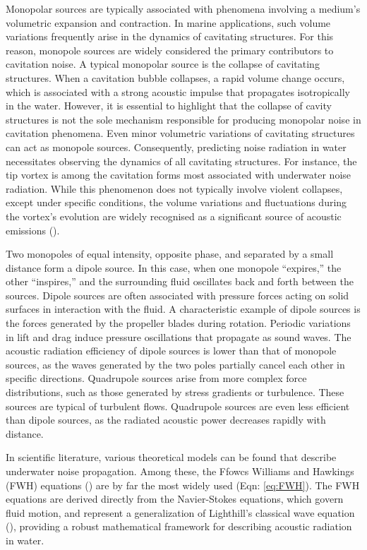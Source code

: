 Monopolar sources are typically associated with phenomena involving a medium's volumetric expansion and contraction. In marine applications, such volume variations frequently arise in the dynamics of cavitating structures. For this reason, monopole sources are widely considered the primary contributors to cavitation noise.
A typical monopolar source is the collapse of cavitating structures. When a cavitation bubble collapses, a rapid volume change occurs, which is associated with a strong acoustic impulse that propagates isotropically in the water. 
However, it is essential to highlight that the collapse of cavity structures is not the sole mechanism responsible for producing monopolar noise in cavitation phenomena. Even minor volumetric variations of cavitating structures can act as monopole sources.
Consequently, predicting noise radiation in water necessitates observing the dynamics of all cavitating structures. 
For instance, the tip vortex is among the cavitation forms most associated with underwater noise radiation.
While this phenomenon does not typically involve violent collapses, except under specific conditions, the volume variations and fluctuations during the vortex's evolution are widely recognised as a significant source of acoustic emissions (\cite{ETV_JMSE}).

Two monopoles of equal intensity, opposite phase, and separated by a small distance form a dipole source. In this case, when one monopole “expires,” the other “inspires,” and the surrounding fluid oscillates back and forth between the sources. 
Dipole sources are often associated with pressure forces acting on solid surfaces in interaction with the fluid. A characteristic example of dipole sources is the forces generated by the propeller blades during rotation. Periodic variations in lift and drag induce pressure oscillations that propagate as sound waves.
The acoustic radiation efficiency of dipole sources is lower than that of monopole sources, as the waves generated by the two poles partially cancel each other in specific directions.
Quadrupole sources arise from more complex force distributions, such as those generated by stress gradients or turbulence. These sources are typical of turbulent flows. Quadrupole sources are even less efficient than dipole sources, as the radiated acoustic power decreases rapidly with distance.

In scientific literature, various theoretical models can be found that describe underwater noise propagation. Among these, the Ffowcs Williams and Hawkings (FWH) equations (\cite{Ffowcs1969}) are by far the most widely used (Eqn: \ref{eq:FWH}). 
The FWH equations are derived directly from the Navier-Stokes equations, which govern fluid motion, and represent a generalization of Lighthill’s classical wave equation (\cite{Lighthill1952}), providing a robust mathematical framework for describing acoustic radiation in water. 

